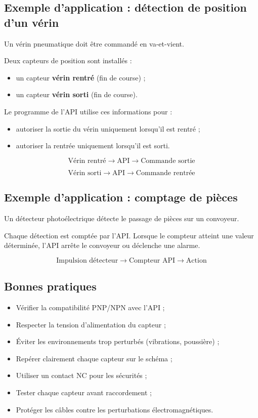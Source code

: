 \subsection{Exemple d'application : détection de position d'un vérin}

Un vérin pneumatique doit être commandé en va-et-vient.

Deux capteurs de position sont installés :

\begin{itemize}
    \item un capteur \textbf{vérin rentré} (fin de course) ;
    \item un capteur \textbf{vérin sorti} (fin de course).
\end{itemize}

Le programme de l'API utilise ces informations pour :

\begin{itemize}
    \item autoriser la sortie du vérin uniquement lorsqu'il est rentré ;
    \item autoriser la rentrée uniquement lorsqu'il est sorti.
\end{itemize}

\[
\text{Vérin rentré} \rightarrow \text{API} \rightarrow \text{Commande sortie}
\]

\[
\text{Vérin sorti} \rightarrow \text{API} \rightarrow \text{Commande rentrée}
\]

\subsection{Exemple d'application : comptage de pièces}

Un détecteur photoélectrique détecte le passage de pièces sur un convoyeur.

Chaque détection est comptée par l'API. Lorsque le compteur atteint une valeur déterminée, l'API arrête le convoyeur ou déclenche une alarme.

\[
\text{Impulsion détecteur} \rightarrow \text{Compteur API} \rightarrow \text{Action}
\]

\subsection{Bonnes pratiques}

\begin{itemize}
    \item Vérifier la compatibilité PNP/NPN avec l'API ;
    \item Respecter la tension d'alimentation du capteur ;
    \item Éviter les environnements trop perturbés (vibrations, poussière) ;
    \item Repérer clairement chaque capteur sur le schéma ;
    \item Utiliser un contact NC pour les sécurités ;
    \item Tester chaque capteur avant raccordement ;
    \item Protéger les câbles contre les perturbations électromagnétiques.
\end{itemize}

